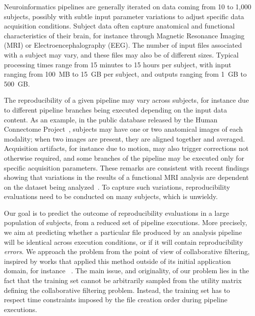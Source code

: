 \documentclass[10pt, conference, compsocconf]{IEEEtran}
\begin{document}
Neuroinformatics pipelines are generally iterated on data coming from 10 to 
1,000 subjects, possibly with subtle input parameter variations to 
adjust specific data acquisition conditions. Subject data often capture 
anatomical and functional characteristics of their brain, for instance through
Magnetic Resonance Imaging (MRI) or Electroencephalography (EEG). The number of input files 
associated with a subject may vary, and these files may also be of 
different sizes. Typical processing times range from 15 minutes to 
15 hours per subject, with input ranging from 100~MB to 15~GB per subject, and 
outputs ranging from 1~GB to 500~GB.

The reproducibility of a given pipeline may vary across subjects, for 
instance due to different pipeline branches being executed depending on 
the input data content. As an example, in 
the public database released by the Human Connectome 
Project~\cite{van2013wu}, subjects may have one or two anatomical 
images of each modality; when two images are present, they are
aligned together and averaged. Acquisition artifacts, for instance due to motion,
may also trigger corrections not otherwise required, and some 
branches of the pipeline may be executed only for specific 
acquisition 
parameters. These remarks are 
consistent with recent findings showing that variations in the 
results of a functional MRI analysis are dependent on the dataset being 
analyzed~\cite{bowring2018exploring}. To capture such variations, 
reproducibility evaluations need to be conducted on many subjects, 
which is unwieldy. 

Our goal is to predict the outcome of reproducibility evaluations in a 
large population of subjects, from a reduced set of pipeline 
executions. More precisely, we aim at predicting whether a particular 
file produced by an analysis pipeline will be identical across 
execution conditions, or if it will contain reproducibility 
\emph{errors}. We approach the problem from the point of view of 
collaborative filtering, inspired by works that applied 
this method outside of its initial application domain, for instance 
~\cite{feng2013efficient}. The main issue, and originality, of our 
problem lies in the fact that the training set cannot be arbitrarily 
sampled from the utility matrix defining the collaborative filtering problem. Instead, the training set has to 
respect time constraints imposed by the file creation order during 
pipeline executions.
\end{document}
